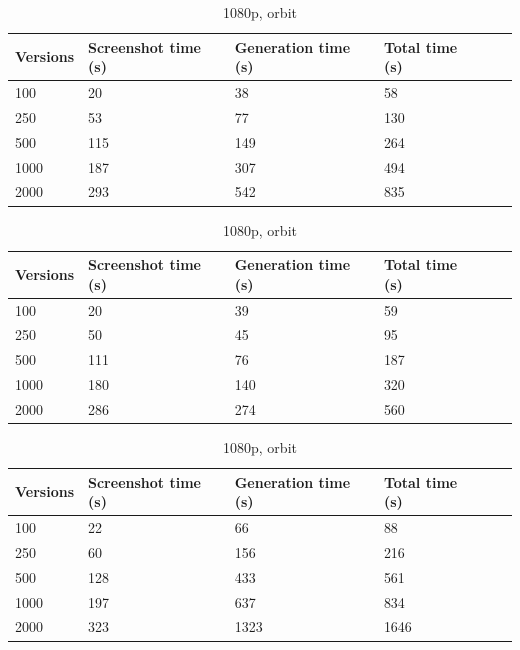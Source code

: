 \documentclass[]{usiinfbachelorproject}
\begin{document}
\begin{table}[H]
    \begin{center}
        \begin{tabular}{ | l | l | l | l | l | l |}
        \hline
        Versions & Screenshot time (s) & Generation time (s)& Total time (s) \\ \hline
        100 & 20 & 38 & 58 \\ \hline
        250 & 53 & 77 & 130 \\ \hline
        500 & 115 & 149 & 264\\ \hline
        1000 & 187 & 307 & 494 \\ \hline
        2000 & 293 & 542 & 835 \\ \hline
        \end{tabular}
    \end{center}
    \caption{720p, orbit}
    \label{tab:performance3}

    \begin{center}
        \begin{tabular}{ | l | l | l | l | l | l |}
        \hline
        Versions & Screenshot time (s) & Generation time (s)& Total time (s) \\ \hline
        100 & 20 & 39 & 59 \\ \hline
        250 & 50 & 45 & 95\\ \hline
        500 & 111 & 76 & 187\\ \hline
        1000 & 180 & 140 & 320 \\ \hline
        2000 & 286 & 274 & 560 \\ \hline
        \end{tabular}
    \end{center}
    \caption{720p, no orbit}
    \label{tab:performance4}

    \begin{center}
        \begin{tabular}{ | l | l | l | l | l | l |}
        \hline
        Versions & Screenshot time (s) & Generation time (s)& Total time (s) \\ \hline
        100 & 22 & 66 & 88 \\ \hline
        250 & 60 & 156 & 216\\ \hline
        500 & 128 & 433 & 561\\ \hline
        1000 & 197 & 637 & 834\\ \hline
        2000 & 323 & 1323 & 1646\\ \hline
        \end{tabular}
    \end{center}
    \caption{1080p, orbit}
    \label{tab:performance5}


\end{table}
\end{document}

